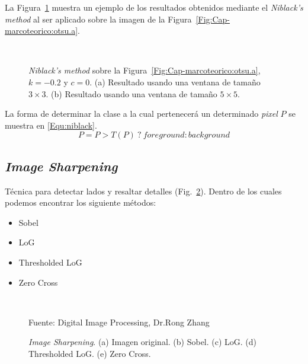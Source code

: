 	La Figura~\ref{Fig:Cap-marcoteorico:niblack} muestra un ejemplo de los 
	resultados obtenidos mediante el \textit{Niblack's method} al ser aplicado
	sobre la imagen de la Figura~\ref{Fig:Cap-marcoteorico:otsu.a}.%
		
	\begin{figure}[h!]
	\centering
	\setlength{\fboxsep}{0pt}
   { }
   \\
	\caption[\textit{Niblack's method}]{\textit{Niblack's method} sobre la
	Figura~\ref{Fig:Cap-marcoteorico:otsu.a}, $k=-0.2$ y $c=0$. (a) Resultado
	usando una ventana de tamaño $3\times 3$. (b) Resultado usando una ventana 
	de tamaño $5\times 5$.}
	\label{Fig:Cap-marcoteorico:niblack}
	\end{figure}
	
	La forma de determinar la clase a la cual pertenecerá un determinado
	\textit{pixel} $P$ se muestra en \ref{Equ:niblack}.
	\begin{equation}
		P = P > T(P) ~?~ \textit{foreground} : \textit{background}
		\label{Equ:niblack}
	\end{equation}	
	
\subsection{\textit{Image Sharpening}}
	Técnica para detectar lados y resaltar detalles (Fig.~\ref{Fig:Sharpening}).
Dentro de los cuales podemos encontrar los siguiente métodos:
	\begin{itemize}
		\item Sobel
    \item LoG
    \item Thresholded LoG
    \item Zero Cross
  \end{itemize}

  \begin{figure}[h!]
		\centering
     { }
    \\
     { }
    \caption[\textit{Image Sharpening}]{\textit{Image Sharpening}. (a) Imagen 
    original. (b) Sobel. (c) LoG. (d) Thresholded LoG. (e) Zero Cross.} 
    \tiny{Fuente: Digital Image Processing, Dr.Rong Zhang}
    \label{Fig:Sharpening}
	\end{figure}    

